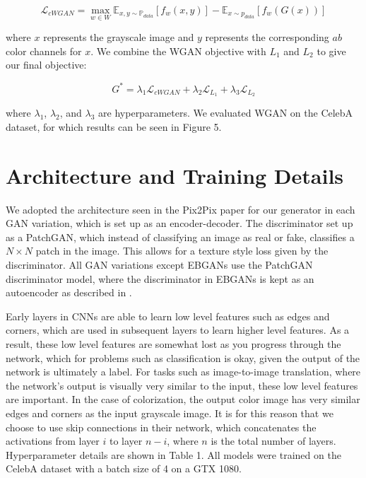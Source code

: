 \documentclass[10pt]{article}
\begin{document}
\[\mathcal{L}_{cWGAN} = \max\limits_{w \in W} \mathbb{E}_{x,y \sim \mathbb{P}_{data}}[f_w(x,y)] -
\mathbb{E}_{x \sim p_{data}}[f_w(G(x))]\]

\noindent where $x$ represents the grayscale image and $y$ represents the corresponding
$ab$ color channels for $x$. We combine the WGAN objective with $L_1$ and $L_2$ to give our final objective:

\[ G^* = \lambda_1 \mathcal{L}_{cWGAN} + \lambda_2 \mathcal{L}_{L_1} + \lambda_3 \mathcal{L}_{L_2} \]

\noindent where $\lambda_1$, $\lambda_2$, and $\lambda_3$ are hyperparameters. We evaluated WGAN on
the CelebA dataset, for which results can be seen in Figure 5. 

\section{Architecture and Training Details}
We adopted the architecture seen in the Pix2Pix paper \cite{isola2016image} for our generator in each GAN variation, which is set up as an encoder-decoder. The 
discriminator set up as a PatchGAN, which instead of classifying an image as real or fake, classifies a $N \times N$ patch in the image. This allows for a texture style loss given
by the discriminator. All GAN variations except EBGANs use the PatchGAN discriminator model, where the discriminator in EBGANs is kept as an autoencoder as described in \cite{zhao2016energy}.

Early layers in CNNs are able to learn low level features such as edges and corners, which are used in subsequent layers to learn higher level features. As a result, these low level features are
somewhat lost as you progress through the network, which for problems such as classification is okay, given the output of the network is ultimately a label. For tasks such as
image-to-image translation, where the network's output is visually very similar to the input, these low level features are important. In the case of colorization, the
output color image has very similar edges and corners as the input grayscale image. It is for this reason that we choose to use skip connections in their network, which concatenates the
activations from layer $i$ to layer $n-i$, where $n$ is the total number of layers. Hyperparameter details are shown in Table 1. All models were trained on the CelebA dataset with a batch size of 4
on a GTX 1080.
\end{document}
